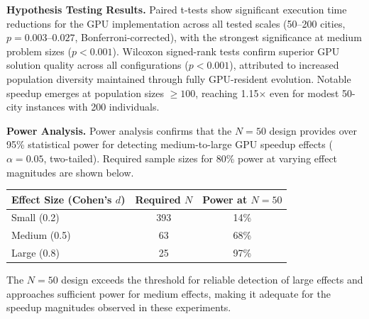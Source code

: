 \documentclass[a4paper,14pt]{extarticle}
\begin{document}
\textbf{Hypothesis Testing Results.} Paired t-tests show significant execution time reductions for the GPU implementation across all tested scales (50--200 cities, $p = 0.003$--$0.027$, Bonferroni-corrected), with the strongest significance at medium problem sizes ($p < 0.001$). Wilcoxon signed-rank tests confirm superior GPU solution quality across all configurations ($p < 0.001$), attributed to increased population diversity maintained through fully GPU-resident evolution. Notable speedup emerges at population sizes $\geq 100$, reaching 1.15$\times$ even for modest 50-city instances with 200 individuals.

\textbf{Power Analysis.} Power analysis confirms that the $N = 50$ design provides over 95\% statistical power for detecting medium-to-large GPU speedup effects ($\alpha = 0.05$, two-tailed). Required sample sizes for 80\% power at varying effect magnitudes are shown below.

\begin{center}
\begin{tabular}{@{}lcc@{}}
\toprule
\textbf{Effect Size (Cohen's $d$)} & \textbf{Required $N$} & \textbf{Power at $N=50$} \\
\midrule
Small (0.2) & 393 & 14\% \\
Medium (0.5) & 63 & 68\% \\
Large (0.8) & 25 & 97\% \\
\bottomrule
\end{tabular}
\end{center}

The $N = 50$ design exceeds the threshold for reliable detection of large effects and approaches sufficient power for medium effects, making it adequate for the speedup magnitudes observed in these experiments.
\end{document}
